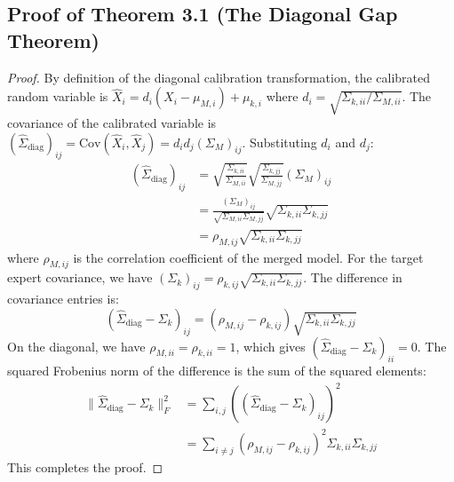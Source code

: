 \documentclass{article}
\theoremstyle{plain}
\theoremstyle{definition}
\theoremstyle{remark}
\begin{document}
\subsection{Proof of Theorem 3.1 (The Diagonal Gap Theorem)}
\label{sec:proofs_diagonal_gap}
\begin{proof}
By definition of the diagonal calibration transformation, the calibrated random variable is $\hat{X}_i = d_i (X_i - \mu_{M,i}) + \mu_{k,i}$ where $d_i = \sqrt{\Sigma_{k,ii}/\Sigma_{M,ii}}$. The covariance of the calibrated variable is $(\hat{\Sigma}_{\text{diag}})_{ij} = \text{Cov}(\hat{X}_i, \hat{X}_j) = d_i d_j (\Sigma_M)_{ij}$.
Substituting $d_i$ and $d_j$:
\begin{align*}
  (\hat{\Sigma}_{\text{diag}})_{ij} &= \sqrt{\frac{\Sigma_{k,ii}}{\Sigma_{M,ii}}} \sqrt{\frac{\Sigma_{k,jj}}{\Sigma_{M,jj}}} (\Sigma_M)_{ij} \\
  &= \frac{(\Sigma_M)_{ij}}{\sqrt{\Sigma_{M,ii} \Sigma_{M,jj}}} \sqrt{\Sigma_{k,ii} \Sigma_{k,jj}} \\
  &= \rho_{M,ij} \sqrt{\Sigma_{k,ii} \Sigma_{k,jj}}
\end{align*}
where $\rho_{M,ij}$ is the correlation coefficient of the merged model. For the target expert covariance, we have $(\Sigma_k)_{ij} = \rho_{k,ij} \sqrt{\Sigma_{k,ii} \Sigma_{k,jj}}$.
The difference in covariance entries is:
\begin{equation*}
  (\hat{\Sigma}_{\text{diag}} - \Sigma_k)_{ij} = (\rho_{M,ij} - \rho_{k,ij}) \sqrt{\Sigma_{k,ii} \Sigma_{k,jj}}
\end{equation*}
On the diagonal, we have $\rho_{M,ii} = \rho_{k,ii} = 1$, which gives $(\hat{\Sigma}_{\text{diag}} - \Sigma_k)_{ii} = 0$.
The squared Frobenius norm of the difference is the sum of the squared elements:
\begin{align*}
  \|\hat{\Sigma}_{\text{diag}} - \Sigma_k\|_F^2 &= \sum_{i,j} \left((\hat{\Sigma}_{\text{diag}} - \Sigma_k)_{ij}\right)^2 \\
  &= \sum_{i \neq j} (\rho_{M,ij} - \rho_{k,ij})^2 \Sigma_{k,ii} \Sigma_{k,jj}
\end{align*}
This completes the proof.
\end{proof}
\end{document}
